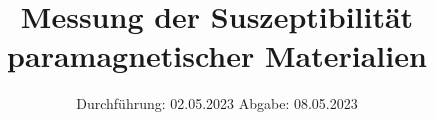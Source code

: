 

\subject{V606}
\title{Messung der Suszeptibilität paramagnetischer Materialien}
\date{%
  Durchführung: 02.05.2023
  \hspace{3em}
  Abgabe: 08.05.2023
}



\maketitle
\thispagestyle{empty}
\tableofcontents
\newpage






\printbibliography{}


